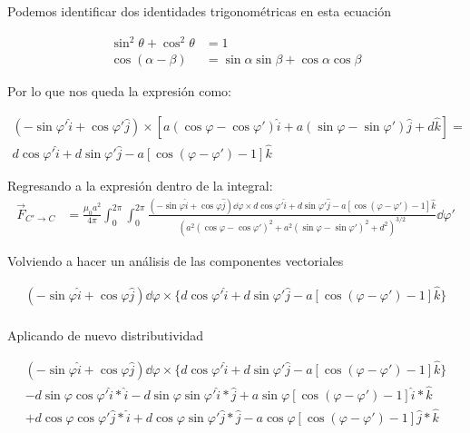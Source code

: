 \documentclass[11pt]{report}
\theoremstyle{plain}
\theoremstyle{definition}
\begin{document}
	Podemos identificar dos identidades trigonométricas en esta ecuación
	
	\begin{align*}%
		\sin^2{\theta} + \cos^2{\theta} &= 1\\
		\cos{(\alpha - \beta)} &= \sin{\alpha }\sin{\beta}+\cos{\alpha }\cos{\beta}
	\end{align*}
	
	Por lo que nos queda la expresión como:
	
	\begin{align*} %
		\left(-\sin\varphi'\hat{i} + \cos\varphi'\hat{j}\right) \times \left[a(\cos\varphi-\cos\varphi')\hat{i} + a(\sin\varphi-\sin\varphi')\hat{j} + d\hat{k} \right] =\\
		d\cos\varphi'\hat{i}+d\sin\varphi'\hat{j}-a\left[\cos{(\varphi-\varphi')}-1\right]\hat{k}
	\end{align*}
	
	Regresando a la expresión dentro de la integral:
	\begin{align*}%
		\vec{F}_{C'\rightarrow C}&= \frac{\mu_0a^2}{4\pi}\int_0^{2\pi}\int_0^{2\pi}\frac{\left(-\sin\varphi\hat{i} + \cos\varphi\hat{j}\right)\dd{\varphi} \times d\cos\varphi'\hat{i}+d\sin\varphi'\hat{j}-a\left[\cos{(\varphi-\varphi')}-1\right]\hat{k}}{\left(a^2(\cos\varphi-\cos\varphi')^2 + a^2(\sin\varphi-\sin\varphi')^2 + d^2\right)^{3/2}}\dd{\varphi'}
	\end{align*}
	
	Volviendo a hacer un análisis de las componentes vectoriales
	
	\begin{align*}%
		\left(-\sin\varphi\hat{i} + \cos\varphi\hat{j}\right)\dd{\varphi} \times \{ d\cos\varphi'\hat{i}+d\sin\varphi'\hat{j}-a\left[\cos{(\varphi-\varphi')}-1\right]\hat{k} \}\\
	\end{align*}
	
	Aplicando de nuevo distributividad
	
	\begin{align*}%
		\left(-\sin\varphi\hat{i} + \cos\varphi\hat{j}\right)\dd{\varphi} \times \{ d\cos\varphi'\hat{i}+d\sin\varphi'\hat{j}-a\left[\cos{(\varphi-\varphi')}-1\right]\hat{k} \}\\
		-d\sin\varphi \cos\varphi'\hat{i} * \hat{i} -d\sin\varphi\sin\varphi'\hat{i}*\hat{j}+ a\sin\varphi\left[\cos{(\varphi-\varphi')}-1\right]\hat{i}*\hat{k}\\
		+d\cos\varphi\cos\varphi'\hat{j}*\hat{i} + d\cos\varphi\sin\varphi'\hat{j}*\hat{j} - a\cos\varphi\left[\cos{(\varphi-\varphi')}-1\right]\hat{j}*\hat{k}
	\end{align*}
	
\end{document}
